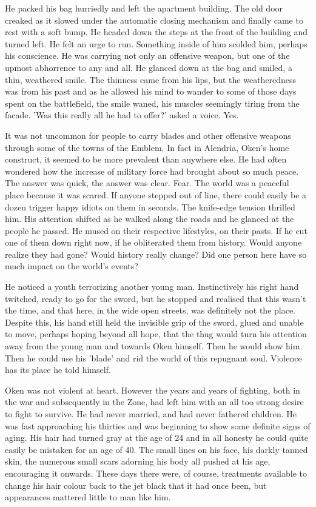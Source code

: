 He packed his bag hurriedly and left the apartment building. The old door creaked as it slowed under the automatic closing mechanism and finally came to rest with a soft bump. He headed down the steps at the front of the building and turned left. He felt an urge to run. Something inside of him scolded him, perhaps his conscience. He was carrying not only an offensive weapon, but one of the upmost abhorrence to any and all. He glanced down at the bag and smiled, a thin, weathered smile. The thinness came from his lips, but the weatheredness was from his past and as he allowed his mind to wander to some of those days spent on the battlefield, the smile waned, his muscles seemingly tiring from the facade. 'Was this really all he had to offer?' asked a voice. Yes.

It was not uncommon for people to carry blades and other offensive weapons through some of the towns of the Emblem. In fact in Alendria, Oken's home construct, it seemed to be more prevalent than anywhere else. He had often wondered how the increase of military force had brought about so much peace. The answer was quick, the answer was clear. Fear. The world was a peaceful place because it was scared. If anyone stepped out of line, there could easily be a dozen trigger happy idiots on them in seconds. The knife-edge tension thrilled him. His attention shifted as he walked along the roads and he glanced at the people he passed. He mused on their respective lifestyles, on their pasts. If he cut one of them down right now, if he obliterated them from history. Would anyone realize they had gone? Would history really change? Did one person here have so much impact on the world's events?

He noticed a youth terrorizing another young man. Instinctively his right hand twitched, ready to go for the sword, but he stopped and realised that this wasn't the time, and that here, in the wide open streets, was definitely not the place. Despite this, his hand still held the invisible grip of the sword, glued and unable to move, perhaps hoping beyond all hope, that the thug would turn his attention away from the young man and towards Oken himself. Then he would show him. Then he could use his 'blade' and rid the world of this repugnant soul. Violence has its place he told himself.

Oken was not violent at heart. However the years and years of fighting, both in the war and subsequently in the Zone, had left him with an all too strong desire to fight to survive. He had never married, and had never fathered children. He was fast approaching his thirties and was beginning to show some definite signs of aging. His hair had turned gray at the age of 24 and in all honesty he could quite easily be mistaken for an age of 40. The small lines on his face, his darkly tanned skin, the numerous small scars adorning his body all pushed at his age, encouraging it onwards. These days there were, of course, treatments available to change his hair colour back to the jet black that it had once been, but appearances mattered little to man like him.

